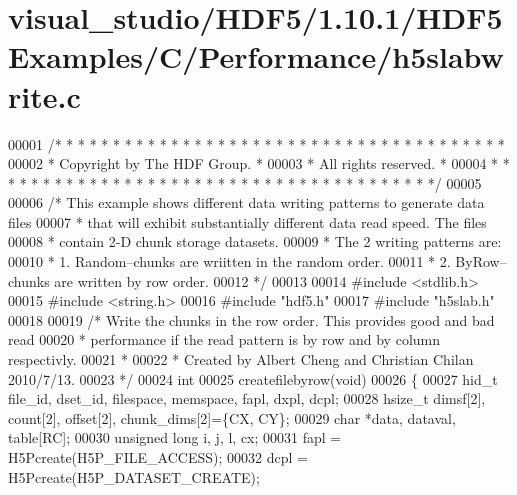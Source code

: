 \hypertarget{visual__studio_2_h_d_f5_21_810_81_2_h_d_f5_examples_2_c_2_performance_2h5slabwrite_8c_source}{}\section{visual\+\_\+studio/\+H\+D\+F5/1.10.1/\+H\+D\+F5\+Examples/\+C/\+Performance/h5slabwrite.c}
\label{visual__studio_2_h_d_f5_21_810_81_2_h_d_f5_examples_2_c_2_performance_2h5slabwrite_8c_source}

\begin{DoxyCode}
00001 \textcolor{comment}{/* * * * * * * * * * * * * * * * * * * * * * * * * * * * * * * * * * * * * * *}
00002 \textcolor{comment}{ * Copyright by The HDF Group.                                               *}
00003 \textcolor{comment}{ * All rights reserved.                                                      *}
00004 \textcolor{comment}{ * * * * * * * * * * * * * * * * * * * * * * * * * * * * * * * * * * * * * * */}
00005 
00006 \textcolor{comment}{/* This example shows different data writing patterns to generate data files}
00007 \textcolor{comment}{ * that will exhibit substantially different data read speed. The files}
00008 \textcolor{comment}{ * contain 2-D chunk storage datasets.}
00009 \textcolor{comment}{ * The 2 writing patterns are:}
00010 \textcolor{comment}{ * 1. Random--chunks are wriitten in the random order.}
00011 \textcolor{comment}{ * 2. ByRow--chunks are written by row order.}
00012 \textcolor{comment}{ */}
00013 
00014 \textcolor{preprocessor}{#include <stdlib.h>}
00015 \textcolor{preprocessor}{#include <string.h>}
00016 \textcolor{preprocessor}{#include "hdf5.h"}
00017 \textcolor{preprocessor}{#include "h5slab.h"}
00018 
00019 \textcolor{comment}{/* Write the chunks in the row order.  This provides good and bad read}
00020 \textcolor{comment}{ * performance if the read pattern is by row and by column respectivly.}
00021 \textcolor{comment}{ *}
00022 \textcolor{comment}{ * Created by Albert Cheng and Christian Chilan 2010/7/13.}
00023 \textcolor{comment}{ */}
00024 \textcolor{keywordtype}{int}
00025 createfilebyrow(\textcolor{keywordtype}{void})
00026 \{
00027     hid\_t   file\_id, dset\_id, filespace, memspace, fapl, dxpl, dcpl;
00028     hsize\_t dimsf[2], count[2], offset[2], chunk\_dims[2]=\{CX, CY\};
00029     \textcolor{keywordtype}{char}     *data, dataval, table[RC];               
00030     \textcolor{keywordtype}{unsigned} \textcolor{keywordtype}{long} i, j, l, cx;
00031     fapl = H5Pcreate(H5P\_FILE\_ACCESS);
00032     dcpl = H5Pcreate(H5P\_DATASET\_CREATE);

\end{DoxyCode}
